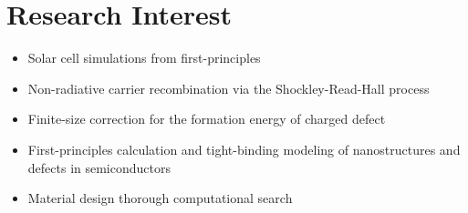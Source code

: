 \section{Research Interest}\label{research-interest}

\begin{itemize}
\tightlist
\item
  Solar cell simulations from first-principles
\item
  Non-radiative carrier recombination via the Shockley-Read-Hall process
\item
  Finite-size correction for the formation energy of charged defect
\item
  First-principles calculation and tight-binding modeling of
  nanostructures and defects in semiconductors
\item
  Material design thorough computational search
\end{itemize}

